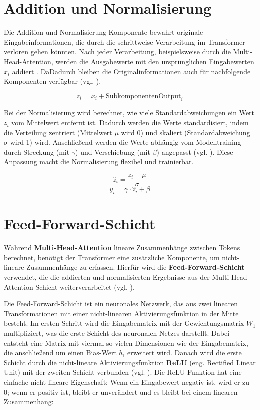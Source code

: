 \section{Addition und Normalisierung}

Die Addition-und-Normalisierung-Komponente bewahrt originale Eingabeinformationen, die durch die schrittweise Verarbeitung im Transformer verloren gehen könnten. 
Nach jeder Verarbeitung, beispielsweise durch die Multi-Head-Attention, werden die Ausgabewerte mit den ursprünglichen Eingabewerten \( x_i \) addiert . 
DaDadurch bleiben die Originalinformationen auch für nachfolgende Komponenten verfügbar (vgl. \cite[K. 3]{layernorm}).

\[
z_i = x_i + \text{SubkomponentenOutput}_i
\]

Bei der Normalisierung wird berechnet, wie viele Standardabweichungen ein Wert \( z_i \) vom Mittelwert entfernt ist. 
Dadurch werden die Werte standardisiert, indem die Verteilung zentriert (Mittelwert \( \mu \) wird 0) und skaliert (Standardabweichung \( \sigma \) wird 1) wird. 
Anschließend werden die Werte abhängig vom Modelltraining durch Streckung (mit \( \gamma \)) und Verschiebung (mit \( \beta \)) angepasst (vgl. \cite[K. 3]{layernorm}). 
Diese Anpassung macht die Normalisierung flexibel und trainierbar.

\[
\hat{z}_i = \frac{z_i - \mu}{\sigma}
\]
\[
y_i = \gamma \cdot \hat{z}_i + \beta
\]

\section{Feed-Forward-Schicht}

Während \textbf{Multi-Head-Attention} lineare Zusammenhänge zwischen Tokens berechnet, benötigt der Transformer eine zusätzliche Komponente, um nicht-lineare Zusammenhänge zu erfassen. 
Hierfür wird die \textbf{Feed-Forward-Schicht} verwendet, die die addierten und normalisierten Ergebnisse aus der Multi-Head-Attention-Schicht weiterverarbeitet (vgl. \cite[S. 5]{attention}).

Die Feed-Forward-Schicht ist ein neuronales Netzwerk, das aus zwei linearen Transformationen mit einer nicht-linearen Aktivierungsfunktion in der Mitte besteht.
Im ersten Schritt wird die Eingabematrix mit der Gewichtungsmatrix \( W_1 \) multipliziert, was die erste Schicht des neuronalen Netzes darstellt. Dabei entsteht eine Matrix mit viermal so vielen Dimensionen wie der Eingabematrix, die anschließend um einen Bias-Wert \( b_1 \) erweitert wird.
Danach wird die erste Schicht durch die nicht-lineare Aktivierungsfunktion \textbf{ReLU} (eng. Rectified Linear Unit) mit der zweiten Schicht verbunden (vgl. \cite[S. 212]{paass.2020}). 
Die ReLU-Funktion hat eine einfache nicht-lineare Eigenschaft: Wenn ein Eingabewert negativ ist, wird er zu 0; wenn er positiv ist, bleibt er unverändert und es bleibt bei einem linearen Zusammenhang:

